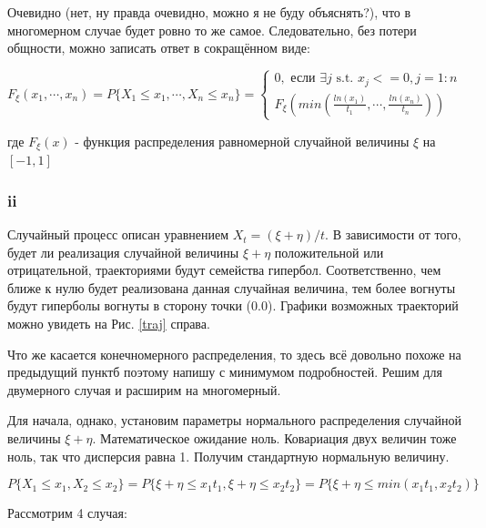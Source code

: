 \documentclass[a4paper,12pt]{article}
\begin{document}
\begin{enumerate}[\Sun]
	Очевидно (нет, ну правда очевидно, можно я не буду объяснять?), что в многомерном случае будет ровно то же самое. Следовательно, без потери общности, можно записать ответ в сокращённом виде:
	
	$ F_\xi(x_1, \cdots, x_n) = P\{X_1 \le x_1,\cdots, X_n \le x_n\} = 
	\begin{cases}
		0, \text{ если }  \exists j \text{ s.t. } x_j <= 0, j = 1:n \\
		F_\xi\left(min\left(\frac{ln(x_1)}{t_1},  \cdots, \frac{ln(x_n)}{t_n}\right) \right)
	\end{cases} $
	
	где $ F_\xi(x) $ - функция распределения равномерной случайной величины $ \xi $ на $ [-1, 1] $
	 
\end{enumerate}

\subsubsection{ii}
Случайный процесс описан уравнением $X_{t}=(\xi+\eta) / t$. В зависимости от того, будет ли реализация случайной величины $ \xi + \eta $ положительной или отрицательной, траекториями будут семейства гипербол. Соответственно, чем ближе к нулю будет реализована данная случайная величина, тем более вогнуты будут гиперболы вогнуты в сторону точки (0.0). Графики возможных траекторий можно увидеть на Рис. \ref{traj} справа.


Что же касается конечномерного распределения, то здесь всё довольно похоже на предыдущий пунктб поэтому напишу с минимумом подробностей. Решим для двумерного случая и расширим на многомерный.

 Для начала, однако, установим параметры нормального распределения случайной величины $ \xi + \eta $. Математическое ожидание ноль. Ковариация двух величин тоже ноль, так что дисперсия равна 1. Получим стандартную нормальную величину.

\[  P\{X_1 \le x_1, X_2 \le x_2\} = P\{ \xi + \eta \le x_1 t_1, \xi + \eta \le x_2 t_2 \} = P\{ \xi + \eta \le min(x_1 t_1, x_2 t_2) \} \]

Рассмотрим 4 случая:
\end{document}
